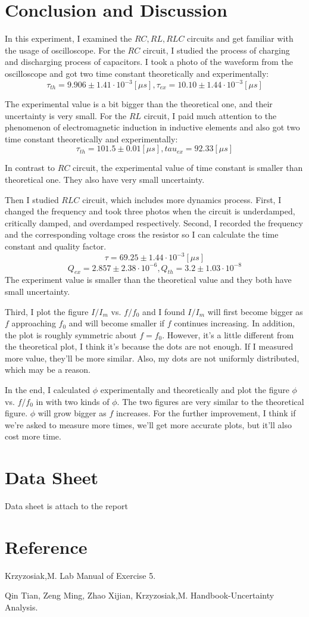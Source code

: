 \documentclass[12pt]{article}
\begin{document}
\section{Conclusion and Discussion}
In this experiment, I examined the $RC,RL,RLC$ circuits and get familiar with the usage of oscilloscope. For the $RC$ circuit, I studied the process of charging and discharging process of capacitors. I took a photo of the waveform from the oscilloscope and got two time constant theoretically and experimentally:
$$\tau_{th}=9.906\pm1.41\cdot10^{-3}[\mu s],\tau_{ex}=10.10\pm1.44\cdot10^{-3}[\mu s]$$
\par The experimental value is a bit bigger than the theoretical one, and their uncertainty is very small.
For the $RL$ circuit, I paid much attention to the phenomenon of electromagnetic induction in inductive elements and also got
two time constant theoretically and experimentally:
$$\tau_{th}=101.5\pm0.01[\mu s],tau_{ex}=92.33[\mu s]$$
\par In contrast to $RC$ circuit, the experimental value of time constant is smaller than theoretical one. They also have very small uncertainty.
\par Then I studied $RLC$ circuit, which includes more dynamics process. First, I changed the frequency and took three photos when the circuit is underdamped, critically damped, and overdamped respectively. Second, I recorded the frequency and the corresponding voltage cross the resistor so I can calculate the time constant and quality factor.
$$\tau=69.25\pm1.44\cdot10^{-3}[\mu s]$$
$$Q_{ex}=2.857\pm2.38\cdot10^{-6},Q_{th}=3.2\pm1.03\cdot10^{-8}$$
The experiment value is smaller than the theoretical value and they both have small uncertainty.
\par Third, I plot the figure $I/I_m$ vs. $f/f_0$ and I found $I/I_m$ will first become bigger as $f$ approaching $f_0$ and will become smaller if $f$ continues increasing. In addition, the plot is roughly symmetric about $f=f_0$. However, it's a little different from the theoretical plot, I think it's because the dots are not enough. If I measured more value, they'll be more similar. Also, my dots are not uniformly distributed, which may be a reason.
\par In the end, I calculated $\phi$ experimentally and theoretically and plot the figure $\phi$ vs. $f/f_0$ in with two kinds of $\phi$. The two figures are very similar to the theoretical figure. $\phi$ will grow bigger as $f$ increases. For the further improvement, I think if we're asked to measure more times, we'll get more accurate plots, but it'll also cost more time. 
\section{Data Sheet}
Data sheet is attach to the report
\section{Reference}
\par Krzyzosiak,M. Lab Manual of Exercise 5.
\par Qin Tian, Zeng Ming, Zhao Xijian, Krzyzosiak,M. Handbook-Uncertainty Analysis.
\end{document}
